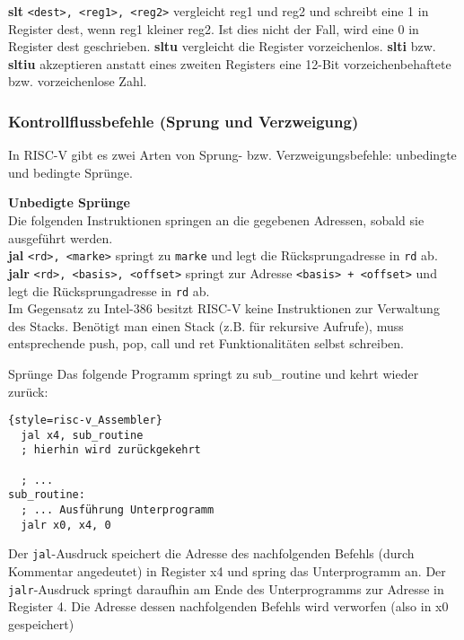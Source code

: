 \textbf{slt} \texttt{<dest>, <reg1>, <reg2>} vergleicht reg1 und reg2 und schreibt eine 1 in Register dest, wenn reg1 kleiner reg2. Ist dies nicht der Fall, wird eine 0 in Register dest geschrieben. \textbf{sltu} vergleicht die Register vorzeichenlos. \textbf{slti} bzw. \textbf{sltiu} akzeptieren anstatt eines zweiten Registers eine 12-Bit vorzeichenbehaftete bzw. vorzeichenlose Zahl.

\subsubsection{Kontrollflussbefehle (Sprung und Verzweigung)}
\label{manual-riscv-jump-instructions}
In RISC-V gibt es zwei Arten von Sprung- bzw. Verzweigungsbefehle: unbedingte und bedingte Sprünge.

\textbf{Unbedigte Sprünge}\\

Die folgenden Instruktionen springen an die gegebenen Adressen, sobald sie ausgeführt werden.\\
\textbf{jal} \texttt{<rd>, <marke>} springt zu \texttt{marke} und legt die Rücksprungadresse in \texttt{rd} ab.\\
\textbf{jalr} \texttt{<rd>, <basis>, <offset>} springt zur Adresse \texttt{<basis> + <offset>} und legt die Rücksprungadresse in \texttt{rd} ab.\\

Im Gegensatz zu Intel-386 besitzt RISC-V keine Instruktionen zur Verwaltung des Stacks. Benötigt man einen Stack (z.B. für rekursive Aufrufe), muss entsprechende push, pop, call und ret Funktionalitäten selbst schreiben.

\begin{exampleblock}{Sprünge}
Das folgende Programm springt zu sub\_routine und kehrt wieder zurück:
\begin{lstlisting}{style=risc-v_Assembler}
  jal x4, sub_routine
  ; hierhin wird zurückgekehrt
  
  ; ...
sub_routine:
  ; ... Ausführung Unterprogramm
  jalr x0, x4, 0
\end{lstlisting}
Der \texttt{jal}-Ausdruck speichert die Adresse des nachfolgenden Befehls (durch Kommentar angedeutet) in Register x4 und spring das Unterprogramm an. Der \texttt{jalr}-Ausdruck springt daraufhin am Ende des Unterprogramms zur Adresse in Register 4. Die Adresse dessen nachfolgenden Befehls wird verworfen (also in x0 gespeichert)
\end{exampleblock}

